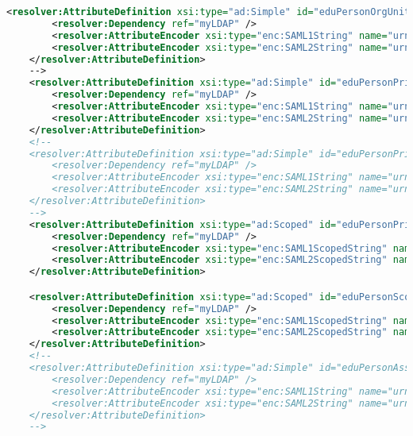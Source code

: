 \begin{lstlisting}[language=xml]
    <resolver:AttributeDefinition xsi:type="ad:Simple" id="eduPersonOrgUnitDN" sourceAttributeID="eduPersonOrgUnitDN">
        <resolver:Dependency ref="myLDAP" />
        <resolver:AttributeEncoder xsi:type="enc:SAML1String" name="urn:mace:dir:attribute-def:eduPersonOrgUnitDN" />
        <resolver:AttributeEncoder xsi:type="enc:SAML2String" name="urn:oid:1.3.6.1.4.1.5923.1.1.1.4" friendlyName="eduPersonOrgUnitDN" />
    </resolver:AttributeDefinition>
    -->
    <resolver:AttributeDefinition xsi:type="ad:Simple" id="eduPersonPrimaryAffiliation" sourceAttributeID="eduPersonPrimaryAffiliation">
        <resolver:Dependency ref="myLDAP" />
        <resolver:AttributeEncoder xsi:type="enc:SAML1String" name="urn:mace:dir:attribute-def:eduPersonPrimaryAffiliation" />
        <resolver:AttributeEncoder xsi:type="enc:SAML2String" name="urn:oid:1.3.6.1.4.1.5923.1.1.1.5" friendlyName="eduPersonPrimaryAffiliation" />
    </resolver:AttributeDefinition>
    <!--
    <resolver:AttributeDefinition xsi:type="ad:Simple" id="eduPersonPrimaryOrgUnitDN" sourceAttributeID="eduPersonPrimaryOrgUnitDN">
        <resolver:Dependency ref="myLDAP" />
        <resolver:AttributeEncoder xsi:type="enc:SAML1String" name="urn:mace:dir:attribute-def:eduPersonPrimaryOrgUnitDN" />
        <resolver:AttributeEncoder xsi:type="enc:SAML2String" name="urn:oid:1.3.6.1.4.1.5923.1.1.1.8" friendlyName="eduPersonPrimaryOrgUnitDN" />
    </resolver:AttributeDefinition>
    -->
    <resolver:AttributeDefinition xsi:type="ad:Scoped" id="eduPersonPrincipalName" scope="shib.lan" sourceAttributeID="uid">
        <resolver:Dependency ref="myLDAP" />
        <resolver:AttributeEncoder xsi:type="enc:SAML1ScopedString" name="urn:mace:dir:attribute-def:eduPersonPrincipalName" />
        <resolver:AttributeEncoder xsi:type="enc:SAML2ScopedString" name="urn:oid:1.3.6.1.4.1.5923.1.1.1.6" friendlyName="eduPersonPrincipalName" />
    </resolver:AttributeDefinition>

    <resolver:AttributeDefinition xsi:type="ad:Scoped" id="eduPersonScopedAffiliation" scope="shib.lan" sourceAttributeID="eduPersonAffiliation">
        <resolver:Dependency ref="myLDAP" />
        <resolver:AttributeEncoder xsi:type="enc:SAML1ScopedString" name="urn:mace:dir:attribute-def:eduPersonScopedAffiliation" />
        <resolver:AttributeEncoder xsi:type="enc:SAML2ScopedString" name="urn:oid:1.3.6.1.4.1.5923.1.1.1.9" friendlyName="eduPersonScopedAffiliation" />
    </resolver:AttributeDefinition>
    <!--
    <resolver:AttributeDefinition xsi:type="ad:Simple" id="eduPersonAssurance" sourceAttributeID="eduPersonAssurance">
        <resolver:Dependency ref="myLDAP" />
        <resolver:AttributeEncoder xsi:type="enc:SAML1String" name="urn:mace:dir:attribute-def:eduPersonAssurance" />
        <resolver:AttributeEncoder xsi:type="enc:SAML2String" name="urn:oid:1.3.6.1.4.1.5923.1.1.1.11" friendlyName="eduPersonAssurance" />
    </resolver:AttributeDefinition>
    -->


\end{lstlisting}
